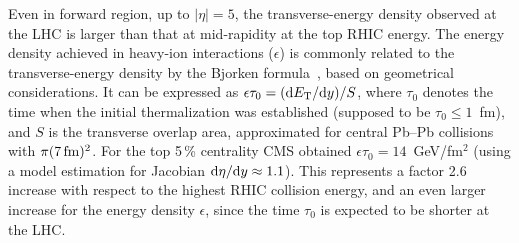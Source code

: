 Even in forward region, up to $|\eta| = 5$, the transverse-energy density observed at the LHC is larger than that at mid-rapidity at the top RHIC energy. The energy density achieved in heavy-ion interactions ($\epsilon$) is commonly related to the transverse-energy density by the Bjorken formula~\cite{}, based on geometrical considerations. It can be expressed as $\epsilon \tau_{0} = ({\rm d}E_{\rm T}/{\rm d}y) / S$, where $\tau_{0}$ denotes the time when the initial thermalization was established (supposed to be $\tau_{0} \leq 1$~fm), and $S$ is the transverse overlap area, approximated for central Pb--Pb collisions with $\pi (7\,{\rm fm})^2$. For the top 5\,\% centrality CMS obtained $\epsilon \tau_{0} = 14$~GeV/fm$^2$ (using a model estimation for Jacobian ${\rm d}\eta/{\rm d}y \approx 1.1$). This represents a factor 2.6 increase with respect to the highest RHIC collision energy, and an even larger increase for the energy density $\epsilon$, since the time $\tau_{0}$ is expected to be shorter at the LHC.
